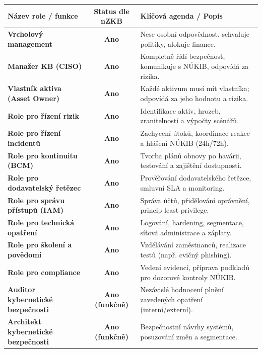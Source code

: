 \documentclass[10pt,a4paper]{article}
\begin{document}
	\begin{center}
		\small
		\begin{tabular}{|l|c|p{7.6cm}|}
			\hline
			\textbf{Název role / funkce} & \textbf{Status dle nZKB} & \textbf{Klíčová agenda / Popis} \\ \hline\hline
			\textbf{Vrcholový management} & \textbf{Ano} & Nese osobní odpovědnost, schvaluje politiky, alokuje finance. \\ \hline
			\textbf{Manažer KB (CISO)} & \textbf{Ano} & Kompletně řídí bezpečnost, komunikuje s NÚKIB, odpovídá za rizika. \\ \hline
			\textbf{Vlastník aktiva (Asset Owner)} & \textbf{Ano} & Každé aktivum musí mít vlastníka; odpovídá za jeho hodnotu a rizika. \\ \hline
			\textbf{Role pro řízení rizik} & \textbf{Ano} & Identifikace aktiv, hrozeb, zranitelností a výpočty scénářů. \\ \hline
			\textbf{Role pro řízení incidentů} & \textbf{Ano} & Zachycení útoků, koordinace reakce a hlášení NÚKIB (24h/72h). \\ \hline
			\textbf{Role pro kontinuitu (BCM)} & \textbf{Ano} & Tvorba plánů obnovy po havárii, testování a zajištění dostupnosti. \\ \hline
			\textbf{Role pro dodavatelský řetězec} & \textbf{Ano} & Prověřování dodavatelského řetězce, smluvní SLA a monitoring. \\ \hline
			\textbf{Role pro správu přístupů (IAM)} & \textbf{Ano} & Správa účtů, přidělování oprávnění, princip least privilege. \\ \hline
			\textbf{Role pro technická opatření} & \textbf{Ano} & Logování, hardening, segmentace, síťová administrace a záplaty. \\ \hline
			\textbf{Role pro školení a povědomí} & \textbf{Ano} & Vzdělávání zaměstnanců, realizace testů (např. cvičný phishing). \\ \hline
			\textbf{Role pro compliance} & \textbf{Ano} & Vedení evidencí, příprava podkladů pro dozorové kontroly NÚKIB. \\ \hline
			\textbf{Auditor kybernetické bezpečnosti} & \textbf{Ano (funkčně)} & Nezávislé hodnocení plnění zavedených opatření (interní/externí). \\ \hline
			\textbf{Architekt kybernetické bezpečnosti} & \textbf{Ano (funkčně)} & Bezpečnostní návrhy systémů, posuzování změn a segmentace. \\ \hline
		\end{tabular}
	\end{center}
	
\end{document}
